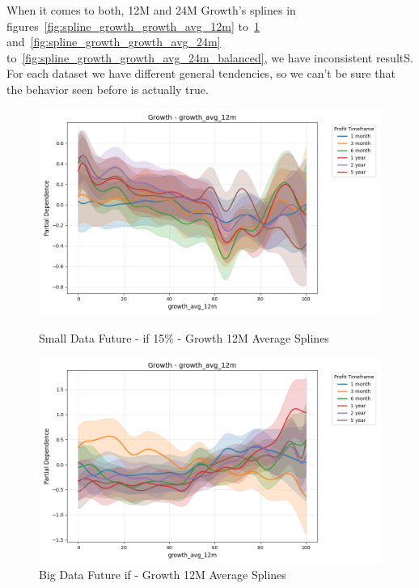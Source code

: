\documentclass[11pt,english,a4paper,hidelinks]{book}
\begin{document}
\noindent When it comes to both, 12M and 24M Growth's splines in figures~\ref{fig:spline_growth_growth_avg_12m} to~\ref{fig:spline_growth_growth_avg_12m_balanced} and~\ref{fig:spline_growth_growth_avg_24m} to~\ref{fig:spline_growth_growth_avg_24m_balanced}, we have inconsistent resultS. For each dataset we have different general tendencies, so we can't be sure that the behavior seen before is actually true.
\begin{figure}[H]
    \centering
    \begin{minipage}{0.48\textwidth}
        \centering
        \includegraphics[width=\textwidth]{images/code/models/general_regression/splines/2D/Small Data future - IF/growth_growth_avg_12m.png}
        \caption{Small Data Future - \acrshort{if} 15\% - Growth 12M Average Splines}
        \label{fig:spline_growth_growth_avg_12m}
    \end{minipage}\hfill
    \begin{minipage}{0.48\textwidth}
        \centering
        \includegraphics[width=\textwidth]{images/code/models/general_regression/splines/2D/Big Data future - IF HARD Balanced/growth_growth_avg_12m.png}
        \caption{Big Data Future \acrshort{if} - Growth 12M Average Splines}
        \label{fig:spline_growth_growth_avg_12m_balanced}
    \end{minipage}
\end{figure}
\end{document}
